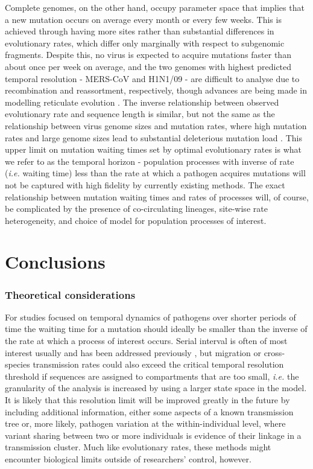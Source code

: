 \documentclass{bmcart}
\begin{document}
Complete genomes, on the other hand, occupy parameter space that implies that a new mutation occurs on average every month or every few weeks.
This is achieved through having more sites rather than substantial differences in evolutionary rates, which differ only marginally with respect to subgenomic fragments.
Despite this, no virus is expected to acquire mutations faster than about once per week on average, and the two genomes with highest predicted temporal resolution - MERS-CoV and H1N1/09 - are difficult to analyse due to recombination and reassortment, respectively, though advances are being made in modelling reticulate evolution \cite{vaughan_inferring_2017}.
The inverse relationship between observed evolutionary rate and sequence length is similar, but not the same as the relationship between virus genome sizes and mutation rates, where high mutation rates and large genome sizes lead to substantial deleterious mutation load \cite{pybus_phylogenetic_2007,gago_extremely_2009}.
This upper limit on mutation waiting times set by optimal evolutionary rates is what we refer to as the temporal horizon - population processes with inverse of rate (\textit{i.e.} waiting time) less than the rate at which a pathogen acquires mutations will not be captured with high fidelity by currently existing methods.
The exact relationship between mutation waiting times and rates of processes will, of course, be complicated by the presence of co-circulating lineages, site-wise rate heterogeneity, and choice of model for population processes of interest.

\section*{Conclusions}
\subsubsection*{Theoretical considerations}
For studies focused on temporal dynamics of pathogens over shorter periods of time the waiting time for a mutation should ideally be smaller than the inverse of the rate at which a process of interest occurs.
Serial interval is often of most interest usually and has been addressed previously \cite{campbell_when_2018,grubaugh_tracking_2019}, but migration or cross-species transmission rates could also exceed the critical temporal resolution threshold if sequences are assigned to compartments that are too small, \textit{i.e.} the granularity of the analysis is increased by using a larger state space in the model.
It is likely that this resolution limit will be improved greatly in the future by including additional information, either some aspects of a known transmission tree or, more likely, pathogen variation at the within-individual level, where variant sharing between two or more individuals is evidence of their linkage in a transmission cluster.
Much like evolutionary rates, these methods might encounter biological limits outside of researchers' control, however.
\end{document}
